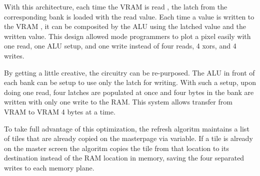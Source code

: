 \documentclass[book.tex]{subfiles}
\begin{document}
With this architecture, each time the VRAM is read , the latch from the corresponding bank is loaded with the read value. Each time a value is written to the VRAM , it can be composited by the ALU using the latched value and the written value. This design allowed mode  programmers to plot a pixel easily with one read, one ALU setup, and one write instead of four reads, 4 xors, and 4 writes.\\
\par
By getting a little creative, the circuitry can be re-purposed. The ALU in front of each bank can be setup to use only the latch for writing. With such a setup, upon doing one read, four latches are populated at once and four bytes in the bank are written with only one write to the RAM. This system allows transfer from VRAM to VRAM 4 bytes at a time.\\
\par
\begin{minipage}{\textwidth}
  
  \end{minipage}
  \label{ega_latch_copy}
  \par

To take full advantage of this optimization, the refresh algoritm maintains a list of tiles that are already copied on the masterpage via  variable. If a tile is already on the master screen the algoritm copies the tile from that location to its destination instead of the RAM location in memory, saving the four separated writes to each memory plane.
\end{document}
